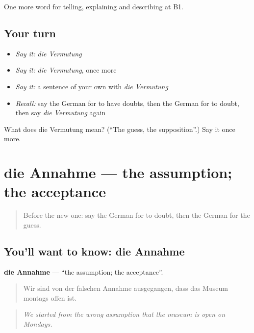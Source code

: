 \begin{grammarlens}[title={What you've built}]
One more word for telling, explaining and describing at B1.
\end{grammarlens}

\subsection*{Your turn}
\begin{itemize}
\raggedright
  \item \emph{Say it:} \emph{die Vermutung}
  \item \emph{Say it:} \emph{die Vermutung}, once more
  \item \emph{Say it:} a sentence of your own with \emph{die Vermutung}
  \item \emph{Recall:} say the German for to have doubts, then the German for to doubt, then say \emph{die Vermutung} again
\end{itemize}

\begin{tcolorbox}[breakable,colback=teal!4,colframe=teal!35!black,title={Before you move on}]
What does die Vermutung mean? (\textquotedblleft{}The guess, the supposition\textquotedblright{}.) Say it once more.
\end{tcolorbox}
\section[die Annahme]{die Annahme — the assumption; the acceptance}

\label{lesson:GE-C338-annahme}



\begin{quote}
Before the new one: say the German for to doubt, then the German for the guess.
\end{quote}

\subsection*{You'll want to know: die Annahme}
\textbf{die Annahme} — \textquotedblleft{}the assumption; the acceptance\textquotedblright{}.

\begin{quote}
Wir sind von der falschen Annahme ausgegangen, dass das Museum montags offen ist.
\end{quote}

\begin{quote}
\emph{We started from the wrong assumption that the museum is open on Mondays.}
\end{quote}

